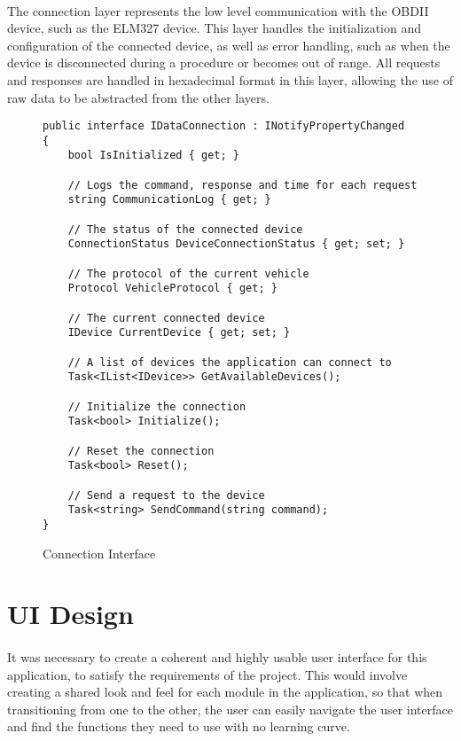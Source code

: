	\paragraph{}{
	The connection layer represents the low level communication with the OBDII device, such as the ELM327 device. This layer handles the initialization and configuration of the connected device, as well as error handling, such as when the device is disconnected during a procedure or becomes out of range. All requests and responses are handled in hexadecimal format in this layer, allowing the use of raw data to be abstracted from the other layers.
	}
	\begin{figure}[h]
		\begin{lstlisting}
public interface IDataConnection : INotifyPropertyChanged
{	
	bool IsInitialized { get; }

	// Logs the command, response and time for each request
	string CommunicationLog { get; }

	// The status of the connected device
    ConnectionStatus DeviceConnectionStatus { get; set; }

	// The protocol of the current vehicle
	Protocol VehicleProtocol { get; }

	// The current connected device
    IDevice CurrentDevice { get; set; }

	// A list of devices the application can connect to
	Task<IList<IDevice>> GetAvailableDevices();

	// Initialize the connection
	Task<bool> Initialize();	

	// Reset the connection
	Task<bool> Reset();

	// Send a request to the device
    Task<string> SendCommand(string command);
}
		\end{lstlisting}
		\caption{Connection Interface}
		\label{code:ConnectionInterface}
	\end{figure}

\section{UI Design}
	\paragraph{}{
	It was necessary to create a coherent and highly usable user interface for this application, to satisfy the requirements of the project. This would involve creating a shared look and feel for each module in the application, so that when transitioning from one to the other, the user can easily navigate the user interface and find the functions they need to use with no learning curve.
	}	
